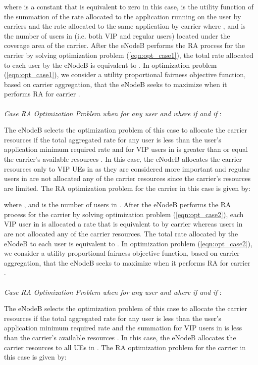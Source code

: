 \documentclass[journal]{IEEEtran} 				\IEEEoverridecommandlockouts 						\usepackage{amsmath,amssymb}
\begin{document}
where  is a constant that is equivalent to zero in this case,  is the utility function of the summation of the rate  allocated to the application running on the  user by carriers  and the rate  allocated to the same application by carrier  where ,  and  is the number of users in  (i.e. both VIP and regular users) located under the coverage area of the  carrier. After the eNodeB performs the RA process for the  carrier by solving optimization problem (\ref{eqn:opt_case1}), the total rate allocated to each user by the eNodeB is equivalent to . In optimization problem (\ref{eqn:opt_case1}), we consider a utility proportional fairness objective function, based on carrier aggregation, that the eNodeB seeks to maximize when it performs RA for carrier .\\
\\\textit{Case RA Optimization Problem when  for any user  and  where  if  and  if }:


The eNodeB selects the optimization problem of this case to allocate the  carrier resources if the total aggregated rate  for any user  is less than the user's application minimum required rate  and  for VIP users in  is greater than or equal the carrier's available resources . In this case, the eNodeB allocates the  carrier resources only to VIP UEs in  as they are considered more important and regular users in  are not allocated any of the  carrier resources since the carrier's resources are limited. The RA optimization problem for the  carrier in this case is given by:


where ,  and  is the number of users in . After the eNodeB performs the RA process for the  carrier by solving optimization problem (\ref{eqn:opt_case2}), each VIP user in  is allocated a rate that is equivalent to  by carrier  whereas users in  are not allocated any of the  carrier resources. The total rate allocated by the eNodeB to each user is equivalent to . In optimization problem (\ref{eqn:opt_case2}), we consider a utility proportional fairness objective function, based on carrier aggregation, that the eNodeB seeks to maximize when it performs RA for carrier .\\
\\\textit{Case RA Optimization Problem when  for any user  and  where  if  and  if }:


The eNodeB selects the optimization problem of this case to allocate the  carrier resources if the total aggregated rate  for any user  is less than the user's application minimum required rate  and the summation  for VIP users in  is less than the carrier's available resources . In this case, the eNodeB allocates the  carrier resources to all UEs in . The RA optimization problem for the  carrier in this case is given by:
\end{document}
